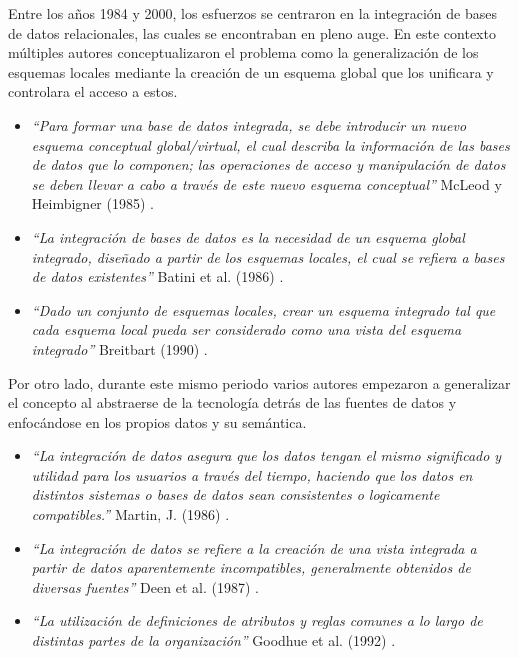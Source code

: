     Entre los años 1984 y 2000, los esfuerzos se centraron en la integración de bases de datos relacionales, las cuales
    se encontraban en pleno auge.  
    En este contexto múltiples autores conceptualizaron el problema como
    la generalización de los esquemas locales mediante la creación de un esquema global que los unificara y controlara el acceso a estos.
        \begin{itemize}
            \item 
            \textit{``Para formar una base de datos integrada, se debe introducir un nuevo esquema conceptual global/virtual,
            el cual describa la información de las bases de datos que lo componen; las operaciones de acceso y manipulación
            de datos se deben llevar a cabo a través de este nuevo esquema conceptual''} McLeod y Heimbigner (1985) \cite{McLeod1985}.

            \item 
           \textit{``La integración de bases de datos es la necesidad de un esquema global integrado, diseñado a partir de los esquemas locales, el cual se refiera a bases de datos existentes''} Batini et al. (1986) \cite{Batini1986}.

            \item \textit{``Dado un conjunto de esquemas locales, crear un esquema integrado tal que cada esquema local pueda ser considerado como una vista
            del esquema integrado''} Breitbart (1990) \cite{breitbart1990multidatabase}.
           
        \end{itemize}

Por otro lado, durante este mismo periodo varios autores empezaron a generalizar el concepto
al abstraerse de la tecnología detrás de las fuentes de datos y enfocándose en los propios datos y su
semántica.
\begin{itemize}
    \item \textit{``La integración de datos asegura que los datos tengan el mismo significado y utilidad para los usuarios a través del tiempo, haciendo que los datos en distintos sistemas o bases de datos sean consistentes o logicamente compatibles.''} Martin, J. (1986) \cite{martin1986information}.
    
    \item \textit{``La integración de datos se refiere a la creación de una vista integrada a partir de datos aparentemente
    incompatibles, generalmente obtenidos de diversas fuentes''} Deen et al. (1987) \cite{deen1987data}.
   
    \item \textit{``La utilización de definiciones de atributos y reglas comunes a lo largo de distintas partes
    de la organización''} Goodhue et al. (1992) \cite{goodhue1992impact}.
\end{itemize}


